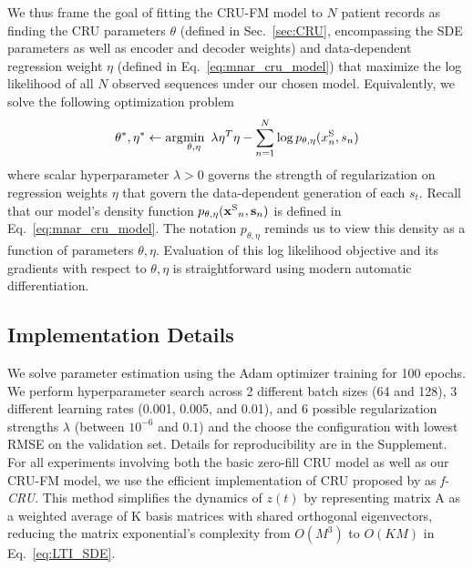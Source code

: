 We thus frame the goal of fitting the CRU-FM model to $N$ patient records as finding the CRU parameters $\theta$ (defined in Sec.~\ref{sec:CRU}, encompassing the SDE parameters as well as encoder and decoder weights) and data-dependent regression weight $\eta$ (defined in Eq.~\eqref{eq:mnar_cru_model}) that maximize the log likelihood of all $N$ observed sequences under our chosen model. Equivalently, we solve the following optimization problem
\begin{align}
    \theta^*, \eta^* \gets \arg\!\min_{\theta, \eta} 
    ~\lambda \eta^T \eta
    - \sum_{n=1}^N \log p_{\theta, \eta}( x^{\text{S}}_n, s_n )
\end{align}
where scalar hyperparameter $\lambda > 0$ governs the strength of regularization on regression weights $\eta$ that govern the data-dependent generation of each $s_t$.
Recall that our model's density function $p_{\theta, \eta}(\mathbf{x^{\text{S}}}_n, \mathbf{s}_n)$ is defined in Eq.~\eqref{eq:mnar_cru_model}. The notation $p_{\theta, \eta}$ reminds us to view this density as a function of parameters $\theta, \eta$. Evaluation of this log likelihood objective and its gradients with respect to $\theta, \eta$ is straightforward using modern automatic differentiation.




\subsection{Implementation Details}

We solve parameter estimation using the Adam optimizer \citep{kingma2014adam} training for 100 epochs. We perform hyperparameter search across 2 different batch sizes (64 and 128), 3 different learning rates (0.001, 0.005, and 0.01), and 6 possible regularization strengths $\lambda$ (between $10^{-6}$ and $0.1$) and the choose the configuration with lowest RMSE on the validation set. Details for reproducibility are in the Supplement. For all experiments involving both the basic zero-fill CRU model as well as our CRU-FM model, we use the efficient implementation of CRU proposed by \cite{schirmer2022modeling} as \emph{f-CRU}. This method simplifies the dynamics of $z(t)$ by representing matrix A as a weighted average of K basis matrices with shared orthogonal eigenvectors, reducing the matrix exponential's complexity from $O(M^3)$ to $O(KM)$ in Eq.~\eqref{eq:LTI_SDE}.

